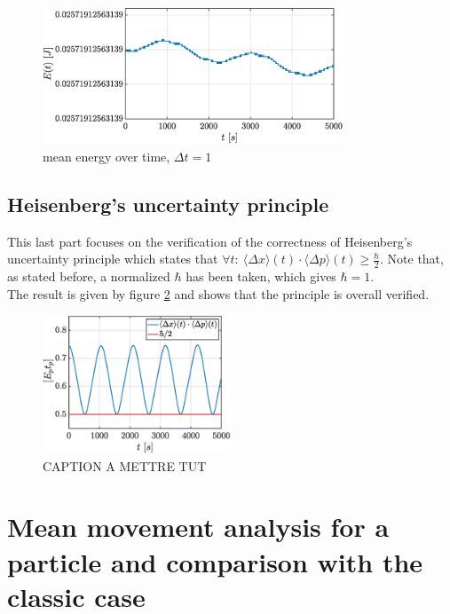 \documentclass[a4paper,12pt,twoside]{article}
\begin{document}
    \begin{figure}[h]
      \centering
      \includegraphics[width=0.8\textwidth]{graphs/i_E.eps}
      \caption{mean energy over time, $\Delta t = 1$}
      \label{fig:i_E}
    \end{figure}

  \subsection{Heisenberg's uncertainty principle}
    This last part focuses on the verification of the correctness of Heisenberg's uncertainty principle which states that $\forall t:~\langle \Delta x \rangle(t)\cdot\langle \Delta p \rangle(t) \geq \frac{\hbar}{2}$. Note that, as stated before, a normalized $\hbar$ has been taken, which gives $\hbar=1$.\\

    The result is given by figure \ref{fig:i_heisenberg} and shows that the principle is overall verified.

    \begin{figure}[h]
      \centering
      \includegraphics[width=0.5\textwidth]{graphs/i_heisenberg.eps}
      \caption{CAPTION A METTRE TUT}
      \label{fig:i_heisenberg}
    \end{figure}




\section{Mean movement analysis for a particle and comparison with the classic case}
\end{document}
